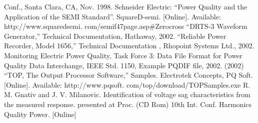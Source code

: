 \documentclass[a4paper,17pt]{extreport}
\begin{document}
\begin{thebibliography}{9}
Conf., Santa Clara, CA, Nov. 1998.
Schneider Electric: “Power Quality and the Application of the SEMI
Standard”. SquareD-semi. [Online]. Available: http://www.squaredsemi.
com/semif47page.asp#Zerocross
“DRTS-3 Waveform Generator,” Technical Documentation, Hathaway,
2002.
“Reliable Power Recorder, Model 1656,” Technical Documentation ,
Rhopoint Systems Ltd., 2002.
Monitoring Electric Power Quality, Task Force 3: Data File Format for
Power Quality Data Interchange, IEEE Std. 1150, Example PQDIF file,
2002.
(2002) “TOP, The Output Processor Software,” Samples. Electrotek
Concepts, PQ Soft. [Online]. Available: http://www.pqsoft.
com/top/download/TOPSamples.exe
R. M. Gnativ and J. V. Milanovic. Identification of voltage sag characteristics
from the measured response. presented at Proc. (CD Rom) 10th
Int. Conf. Harmonics Quality Power. [Online]

\end{thebibliography}
\end{document}

